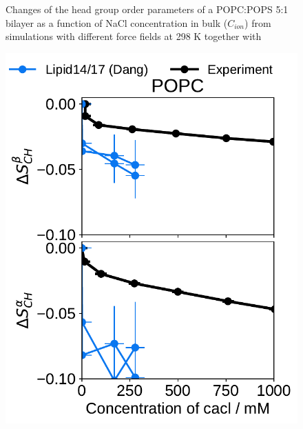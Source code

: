 \documentclass[journal=jpcbfk,manuscript=article]{achemso}
\newlength{\figwidth}
\begin{document}
\begin{figure}[htb!]
  \caption{\label{fig:delta_ordPar_NaCl} 
    Changes of the head group order parameters of a POPC:POPS 5:1 bilayer as a function of NaCl concentration 
    in bulk ($C_{ion}$) from simulations with different force fields at 298 K together with  
  } 
\end{figure} 
 

\begin{figure}[htb!] 
  \centering 
  \includegraphics[width=\figwidth]{../Fig/l17/order_parameters_changes_A-B_POPC_cacl.pdf} 

\end{figure}
\end{document}
